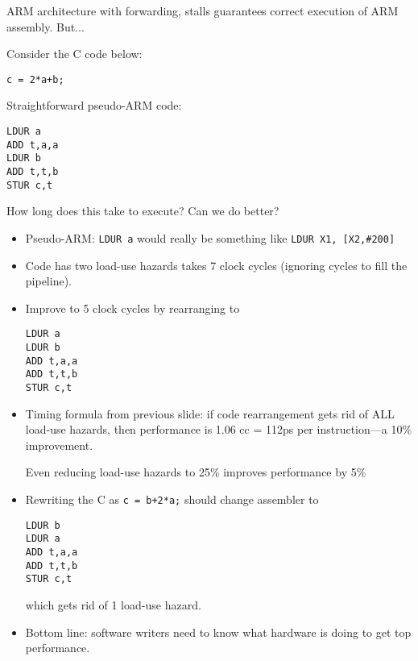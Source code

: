 \begin{frame}[fragile]
ARM architecture with forwarding, stalls guarantees correct execution
of ARM assembly.  But...
\begin{multicols}{2}
Consider the C code below:
\begin{verbatim}
c = 2*a+b;
\end{verbatim}
\columnbreak

Straightforward pseudo-ARM code:
\begin{verbatim}
LDUR a
ADD t,a,a
LDUR b
ADD t,t,b
STUR c,t
\end{verbatim}
\end{multicols}


\begin{tcolorbox}[enhanced,attach boxed title to top center={yshift=-3mm,yshifttext=-1mm},
  colback=blue!5!white,colframe=blue!75!black,colbacktitle=blue!80!black,
  title=Think About It,fonttitle=\bfseries,
  boxed title style={size=small,colframe=red!50!black} ]
 How long does this take to execute? Can we do better?
\end{tcolorbox}


\BNotes\ifnum{}
\begin{itemize}
\item Pseudo-ARM: \texttt{LDUR a} would really be something like
	\texttt{LDUR X1, [X2,\#200]}
\item Code has two load-use hazards takes 7 clock cycles 
	(ignoring cycles to fill the pipeline).
\item Improve to 5 clock cycles by rearranging to
\begin{verbatim}
LDUR a
LDUR b
ADD t,a,a
ADD t,t,b
STUR c,t
\end{verbatim}
\item Timing formula from previous slide: if code rearrangement
	gets rid of ALL load-use hazards, then performance is
	1.06 cc = 112ps per instruction---a 10\% improvement.

	Even reducing load-use hazards to 25\% improves performance by 5\%
\item Rewriting the C as
	\texttt{c = b+2*a;}  should change assembler to
\begin{verbatim}
LDUR b
LDUR a
ADD t,a,a
ADD t,t,b
STUR c,t
\end{verbatim}
which gets rid of 1 load-use hazard.
\item Bottom line: software writers need to know what hardware is doing
	to get top performance.
\end{itemize}
\fi\ENotes
\end{frame}


